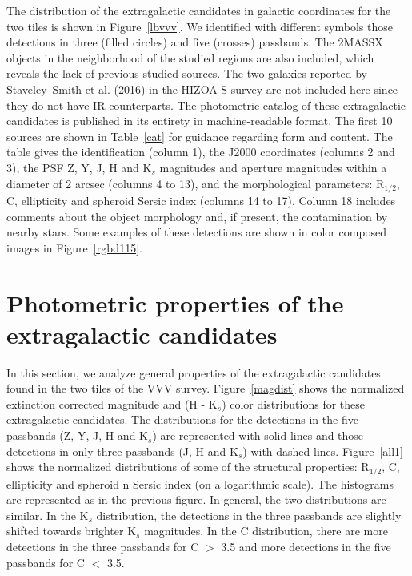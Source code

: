 \documentclass[preprint2]{aastex}
\begin{document}
The distribution of the  extragalactic candidates  in galactic
  coordinates for the two tiles is shown in Figure~\ref{lbvvv}.  We identified
  with different symbols those detections in three (filled circles) and five
  (crosses) passbands.    The 2MASSX objects in the neighborhood
of the studied regions are also included, which reveals the
lack of previous studied sources.  The two galaxies reported by Staveley--Smith et al. 
(2016) in the HIZOA-S survey are not included here since they do not have
IR counterparts.  The photometric catalog of these  extragalactic candidates
is published in its entirety in machine-readable format.  The first 10
sources are shown in Table~\ref{cat} for guidance regarding form and
content.  The table gives
the identification (column 1), the J2000 coordinates (columns 2 and 3),
the  PSF Z, Y, J, H and K$_s$ magnitudes and aperture magnitudes within
a diameter of 2 arcsec (columns 4 to 13), and the morphological parameters: R$_{1/2}$, C,
ellipticity and spheroid Sersic index (columns 14 to 17).  Column 18
  includes comments about the object morphology and, if
  present, the contamination by nearby stars. Some examples of these
detections are shown in color composed 
images in Figure~\ref{rgbd115}. 


\section{Photometric properties of the extragalactic candidates  }

In this section, we analyze general properties of the extragalactic candidates
found in the
two tiles of the VVV survey.  Figure~\ref{magdist}
shows the normalized extinction corrected magnitude and
(H - K$_s$) color distributions for these extragalactic candidates.  The
  distributions for the detections in the five passbands (Z, Y, J, H and K$_s$) are
  represented with solid lines and those detections in only three passbands (J, H and K$_s$) with dashed lines.   Figure~\ref{all1} shows the
  normalized distributions of some of the
structural properties:
R$_{1/2}$, C,
ellipticity and spheroid n Sersic index (on a logarithmic scale). The histograms are represented as in the previous figure.   In general, the two distributions
  are similar.  In the K$_s$ distribution, the detections in the three passbands
are slightly shifted towards brighter K$_s$ magnitudes.  In the C
distribution, there are more detections in the three 
passbands for C $>$ 3.5 and more detections in the five 
passbands for C $<$ 3.5.
\end{document}
